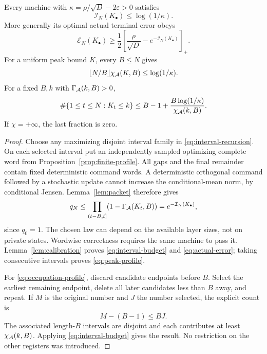 \begin{theorem}\label{thm:profile}
Every machine with $\kappa=\rho/\sqrt D-2\varepsilon>0$ satisfies
\begin{equation}\label{eq:interval-budget}
                 \mathcal I_N(K_\bullet)\le\log(1/\kappa).
\end{equation}
More generally its optimal actual terminal error obeys
\begin{equation}\label{eq:actual-error}
 \mathcal E_N(K_\bullet)\ge
       \frac12\left[\frac\rho{\sqrt D}-e^{-\mathcal I_N(K_\bullet)}\right]_+.
\end{equation}
For a uniform peak bound $K$, every $B\le N$ gives
\begin{equation}\label{eq:peak-profile}
 \lfloor N/B\rfloor\chi_{\mathcal A}(K,B)\le\log(1/\kappa).
\end{equation}
For a fixed $B,k$ with $\Gamma_{\mathcal A}(k,B)>0$,
\begin{equation}\label{eq:occupation-profile}
 \#\{1\le t\le N:K_t\le k\}
 \le B-1+\frac{B\log(1/\kappa)}{\chi_{\mathcal A}(k,B)}.
\end{equation}
If $\chi=+\infty$, the last fraction is zero.
\end{theorem}
\begin{proof}
Choose any maximizing disjoint interval family in \eqref{eq:interval-recursion}. On each selected interval put an independently sampled optimizing complete word from Proposition~\ref{prop:finite-profile}. All gaps and the final remainder contain fixed deterministic command words. A deterministic orthogonal command followed by a stochastic update cannot increase the conditional-mean norm, by conditional Jensen. Lemma~\ref{lem:packet} therefore gives
\[
 q_N\le\prod_{(t-B,t]}(1-\Gamma_{\mathcal A}(K_t,B))
                         =e^{-\mathcal I_N(K_\bullet)},
\]
since $q_0=1$. The chosen law can depend on the available layer sizes, not on private states. Wordwise correctness requires the same machine to pass it. Lemma~\ref{lem:calibration} proves \eqref{eq:interval-budget} and \eqref{eq:actual-error}; taking consecutive intervals proves \eqref{eq:peak-profile}.

For \eqref{eq:occupation-profile}, discard candidate endpoints before $B$. Select the earliest remaining endpoint, delete all later candidates less than $B$ away, and repeat. If $M$ is the original number and $J$ the number selected, the explicit count is
\[
                         M-(B-1)\le BJ.
\]
The associated length-$B$ intervals are disjoint and each contributes at least $\chi_{\mathcal A}(k,B)$. Applying \eqref{eq:interval-budget} gives the result. No restriction on the other registers was introduced.
\end{proof}

